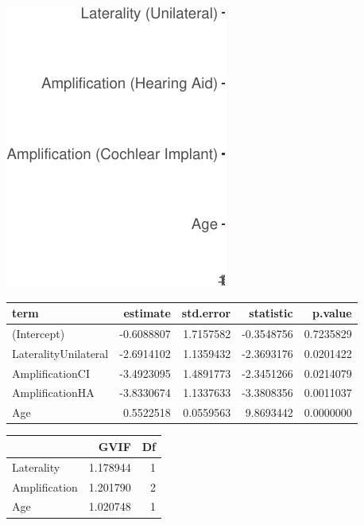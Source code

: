 \documentclass[english,man]{apa6}
\begin{document}
\includegraphics{ELSSP_paper_files/figure-latex/delay-betas-1.pdf}

\begin{table}[H]
\centering
\begin{tabular}{l|r|r|r|r}
\hline
term & estimate & std.error & statistic & p.value\\
\hline
(Intercept) & -0.6088807 & 1.7157582 & -0.3548756 & 0.7235829\\
\hline
LateralityUnilateral & -2.6914102 & 1.1359432 & -2.3693176 & 0.0201422\\
\hline
AmplificationCI & -3.4923095 & 1.4891773 & -2.3451266 & 0.0214079\\
\hline
AmplificationHA & -3.8330674 & 1.1337633 & -3.3808356 & 0.0011037\\
\hline
Age & 0.5522518 & 0.0559563 & 9.8693442 & 0.0000000\\
\hline
\end{tabular}
\end{table}

\begin{table}[H]
\centering
\begin{tabular}{l|r|r}
\hline
  & GVIF & Df\\
\hline
Laterality & 1.178944 & 1\\
\hline
Amplification & 1.201790 & 2\\
\hline
Age & 1.020748 & 1\\
\hline
\end{tabular}
\end{table}
\end{document}
